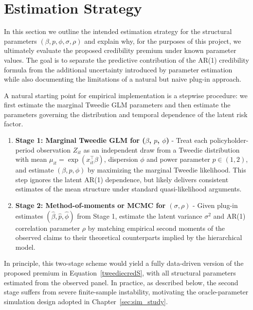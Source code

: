 \documentclass{sfuthesis}
\numberwithin{equation}{chapter}
\begin{document}
\pagebreak


\chapter{Estimation Strategy}
\label{sec:sim_approach}

In this section we outline the intended estimation strategy for the structural
parameters $(\beta, p, \phi, \sigma, \rho)$ and explain why, for the purposes
of this project, we ultimately evaluate the proposed credibility premium under
known parameter values. The goal is to separate the predictive contribution of
the AR(1) credibility formula from the additional uncertainty introduced by
parameter estimation while also documenting the limitations of a natural but
naive plug-in approach.


A natural starting point for empirical implementation is a stepwise
procedure: we first estimate the marginal Tweedie GLM parameters and
then estimate the parameters governing the distribution and temporal
dependence of the latent risk factor.

\begin{enumerate}
    \item \textbf{Stage 1: Marginal Tweedie GLM for ($\beta$, $p$, $\phi$)} - 
    Treat each policyholder-period observation $Z_{it}$ as an independent
    draw from a Tweedie distribution with mean
    $\mu_{it} = \exp(x_{it}^\top \beta)$, dispersion $\phi$ and power
    parameter $p \in (1,2)$, and estimate $(\beta, p, \phi)$ by maximizing
    the marginal Tweedie likelihood. This step ignores the latent AR(1)
    dependence, but likely delivers consistent estimates of the mean structure
    under standard quasi-likelihood arguments.

    \item \textbf{Stage 2: Method-of-moments or MCMC for $(\sigma, \rho)$} - 
    Given plug-in estimates $(\hat\beta, \hat p, \hat\phi)$ from Stage 1,
    estimate the latent variance $\sigma^2$ and AR(1) correlation parameter
    $\rho$ by matching empirical second moments of the observed claims to
    their theoretical counterparts implied by the hierarchical model.
\end{enumerate}

In principle, this two-stage scheme would yield a fully data-driven version of
the proposed premium in Equation~\eqref{tweediecredS}, with all structural
parameters estimated from the observed panel. In practice, as described below,
the second stage suffers from severe finite-sample instability, motivating the
oracle-parameter simulation design adopted in Chapter~\ref{sec:sim_study}.
\end{document}
